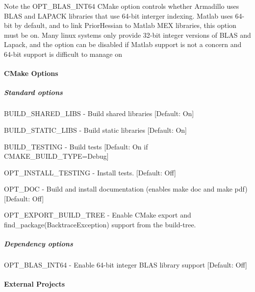 Note the {\ttfamily O\+P\+T\+\_\+\+B\+L\+A\+S\+\_\+\+I\+N\+T64} C\+Make option controls whether Armadillo uses B\+L\+AS and L\+A\+P\+A\+CK libraries that use 64-\/bit interger indexing. Matlab uses 64-\/bit by default, and to link Prior\+Hessian to Matlab M\+EX libraries, this option must be on. Many linux systems only provide 32-\/bit integer versions of B\+L\+AS and Lapack, and the option can be disabled if Matlab support is not a concern and 64-\/bit support is difficult to manage on

\paragraph*{C\+Make Options}

\subparagraph*{Standard options}


\begin{DoxyItemize}
\item {\ttfamily B\+U\+I\+L\+D\+\_\+\+S\+H\+A\+R\+E\+D\+\_\+\+L\+I\+BS} -\/ Build shared libraries \mbox{[}Default\+: On\mbox{]}
\item {\ttfamily B\+U\+I\+L\+D\+\_\+\+S\+T\+A\+T\+I\+C\+\_\+\+L\+I\+BS} -\/ Build static libraries \mbox{[}Default\+: On\mbox{]}
\item {\ttfamily B\+U\+I\+L\+D\+\_\+\+T\+E\+S\+T\+I\+NG} -\/ Build tests \mbox{[}Default\+: On if {\ttfamily C\+M\+A\+K\+E\+\_\+\+B\+U\+I\+L\+D\+\_\+\+T\+Y\+PE=Debug}\mbox{]}
\item {\ttfamily O\+P\+T\+\_\+\+I\+N\+S\+T\+A\+L\+L\+\_\+\+T\+E\+S\+T\+I\+NG} -\/ Install tests. \mbox{[}Default\+: Off\mbox{]}
\item {\ttfamily O\+P\+T\+\_\+\+D\+OC} -\/ Build and install documentation (enables {\ttfamily make doc} and {\ttfamily make pdf}) \mbox{[}Default\+: Off\mbox{]}
\item {\ttfamily O\+P\+T\+\_\+\+E\+X\+P\+O\+R\+T\+\_\+\+B\+U\+I\+L\+D\+\_\+\+T\+R\+EE} -\/ Enable C\+Make export and {\ttfamily find\+\_\+package(\+Backtrace\+Exception)} support from the build-\/tree.
\end{DoxyItemize}

\subparagraph*{Dependency options}


\begin{DoxyItemize}
\item {\ttfamily O\+P\+T\+\_\+\+B\+L\+A\+S\+\_\+\+I\+N\+T64} -\/ Enable 64-\/bit integer B\+L\+AS library support \mbox{[}Default\+: Off\mbox{]}
\end{DoxyItemize}

\paragraph*{External Projects}

